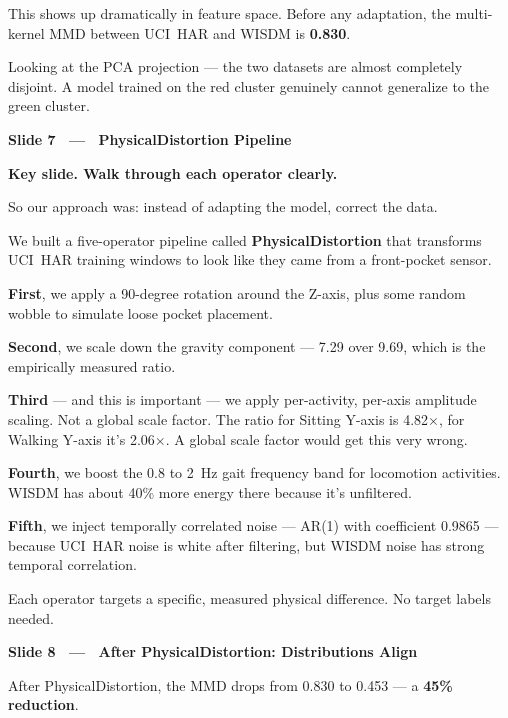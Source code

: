 \documentclass[12pt]{article}
\newcommand{\slidetitle}[1]{%
  \vspace{14pt}%
  \noindent\colorbox{pennblue}{\parbox{\dimexpr\textwidth-2\fboxsep\relax}{%
    \strut\bfseries\color{white}\quad #1\strut}}%
  \vspace{4pt}\par
}
\newcommand{\timing}[1]{%
  \noindent{\small\bfseries\color{pennred}#1}\quad\par\vspace{2pt}%
}
\begin{document}
This shows up dramatically in feature space. Before any adaptation, the
multi-kernel MMD between UCI~HAR and WISDM is \textbf{0.830}.

Looking at the PCA projection --- the two datasets are almost completely
disjoint. A model trained on the red cluster genuinely cannot generalize to
the green cluster.

\slidetitle{Slide 7 \ — \ PhysicalDistortion Pipeline}
\timing{[3:30 – 4:30]}
\begin{slidebox}
\textcolor{pennred}{\textbf{Key slide. Walk through each operator clearly.}}
\end{slidebox}

So our approach was: instead of adapting the model, correct the data.

We built a five-operator pipeline called \textbf{PhysicalDistortion} that
transforms UCI~HAR training windows to look like they came from a
front-pocket sensor.

\textbf{First}, we apply a 90-degree rotation around the Z-axis, plus some
random wobble to simulate loose pocket placement.

\textbf{Second}, we scale down the gravity component --- 7.29 over 9.69,
which is the empirically measured ratio.

\textbf{Third} --- and this is important --- we apply per-activity, per-axis
amplitude scaling. Not a global scale factor. The ratio for Sitting Y-axis is
4.82$\times$, for Walking Y-axis it's 2.06$\times$. A global scale factor
would get this very wrong.

\textbf{Fourth}, we boost the 0.8 to 2~Hz gait frequency band for locomotion
activities. WISDM has about 40\% more energy there because it's unfiltered.

\textbf{Fifth}, we inject temporally correlated noise --- AR(1) with
coefficient 0.9865 --- because UCI~HAR noise is white after filtering, but
WISDM noise has strong temporal correlation.

Each operator targets a specific, measured physical difference.
No target labels needed.

\slidetitle{Slide 8 \ — \ After PhysicalDistortion: Distributions Align}
\timing{[4:30 – 5:00]}

After PhysicalDistortion, the MMD drops from 0.830 to 0.453 ---
a \textbf{45\% reduction}.
\end{document}
